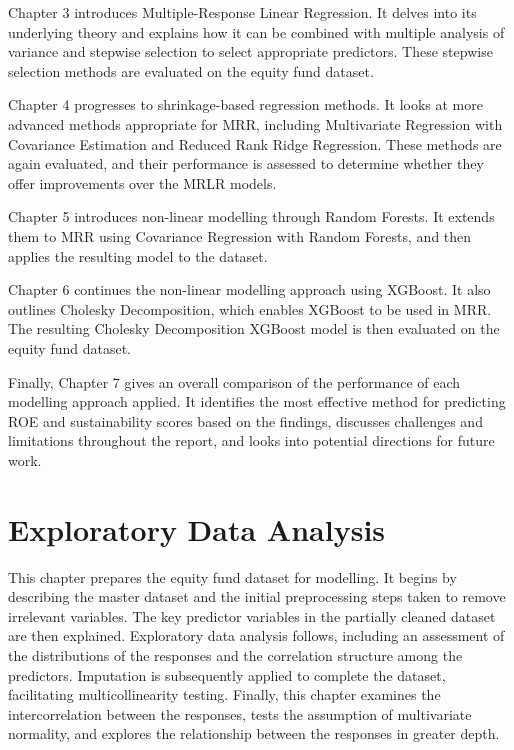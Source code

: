 \documentclass[11pt]{report} %
\begin{document}
Chapter 3 introduces Multiple-Response Linear Regression. It delves into its underlying theory and explains how it can be combined with multiple analysis of variance and stepwise selection to select appropriate predictors. These stepwise selection methods are evaluated on the equity fund dataset.

Chapter 4 progresses to shrinkage-based regression methods. It looks at more advanced methods appropriate for MRR, including Multivariate Regression with Covariance Estimation and Reduced Rank Ridge Regression. These methods are again evaluated, and their performance is assessed to determine whether they offer improvements over the MRLR models.

Chapter 5 introduces non-linear modelling through Random Forests. It extends them to MRR using Covariance Regression with Random Forests, and then applies the resulting model to the dataset.

Chapter 6 continues the non-linear modelling approach using XGBoost. It also outlines Cholesky Decomposition, which enables XGBoost to be used in MRR. The resulting Cholesky Decomposition XGBoost model is then evaluated on the equity fund dataset.

Finally, Chapter 7 gives an overall comparison of the performance of each modelling approach applied. It identifies the most effective method for predicting ROE and sustainability scores based on the findings, discusses challenges and limitations throughout the report, and looks into potential directions for future work.

\chapter{Exploratory Data Analysis}
\label{EDA}
This chapter prepares the equity fund dataset for modelling. It begins by describing the master dataset and the initial preprocessing steps taken to remove irrelevant variables. The key predictor variables in the partially cleaned dataset are then explained. Exploratory data analysis follows, including an assessment of the distributions of the responses and the correlation structure among the predictors. Imputation is subsequently applied to complete the dataset, facilitating multicollinearity testing. Finally, this chapter examines the intercorrelation between the responses, tests the assumption of multivariate normality, and explores the relationship between the responses in greater depth.

\vspace{-0.2cm}
\end{document}
